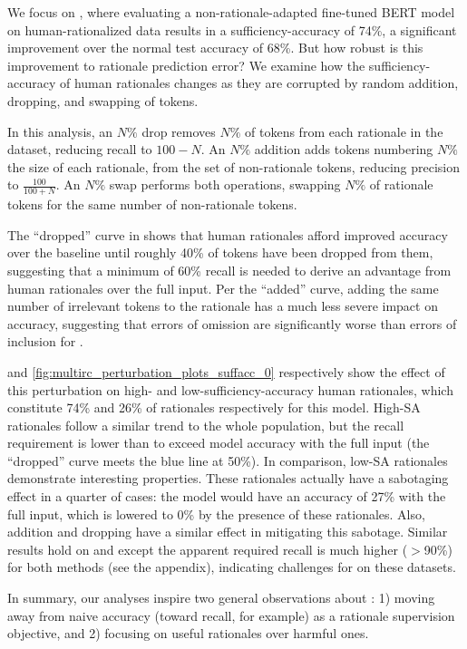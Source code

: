 We focus on \multirc, where evaluating a non-rationale-adapted fine-tuned BERT model on human-rationalized data results in a sufficiency-accuracy of 74\%, a significant improvement over the normal test accuracy of 68\%. But how robust is this improvement to rationale prediction error? We examine how the sufficiency-accuracy of human rationales changes as they are corrupted by random addition, dropping, and swapping of tokens.

In this analysis, an $N\%$ drop removes $N\%$ of tokens from each rationale in the dataset, reducing recall to $100-N$. An $N\%$ addition adds tokens numbering $N\%$ the size of each rationale, from the set of non-rationale tokens, reducing precision to $\frac{100}{100+N}$. An $N\%$ swap performs both operations, swapping $N\%$ of rationale tokens for the same number of non-rationale tokens.

The ``dropped'' curve in 
shows that human rationales afford improved accuracy over the baseline until roughly 40\% of tokens have been dropped from them, suggesting that a minimum of 60\% recall is needed to derive an advantage from human rationales over the full input. Per the ``added'' curve, adding the same number of irrelevant tokens to the rationale has a much less severe impact on accuracy, suggesting 
that errors of omission are significantly worse than errors of inclusion for \learningfromexplanation.

 and \ref{fig:multirc_perturbation_plots_suffacc_0} respectively show the effect of this perturbation on high- and low-sufficiency-accuracy human rationales, which constitute 74\% and 26\% of rationales respectively for this model. High-SA rationales follow a similar trend to the whole population, but the recall requirement is lower than  to exceed model accuracy with the full input (the ``dropped'' curve meets the blue line at 50\%).
In comparison, low-SA rationales demonstrate interesting properties. 
These rationales actually have a sabotaging effect in a quarter of cases: the model would have an accuracy of 27\% with the full input, which is lowered to 0\% by the presence of these rationales. Also, addition and dropping have a similar effect in mitigating this sabotage.
Similar results hold on \fever and \esnli except the apparent required recall is much higher ($>$90\%) for both methods (see the appendix), indicating challenges for \learningfromexplanation on these datasets.


In summary, our analyses inspire two general observations about \learningfromexplanation:
1) moving away from naive accuracy (toward recall, for example) as a rationale supervision objective, and 2) focusing on useful rationales over harmful ones.
